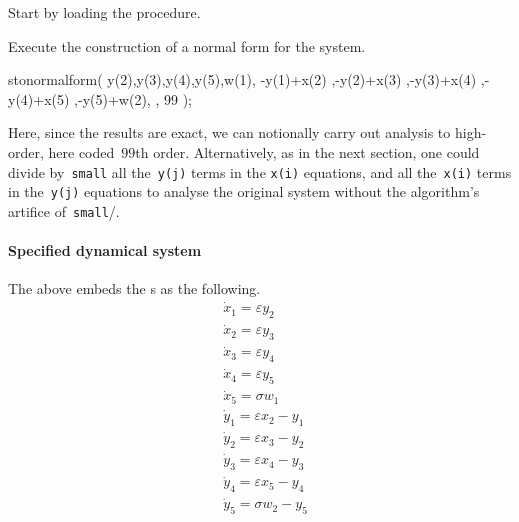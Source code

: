 Start by loading the procedure.
Execute the construction of a normal form for the system.
\begin{reduce}
stonormalform(
    {y(2),y(3),y(4),y(5),w(1)},
    {-y(1)+x(2)
    ,-y(2)+x(3)
    ,-y(3)+x(4)
    ,-y(4)+x(5)
    ,-y(5)+w(2)},
    { },
    99 );
\end{reduce}
Here, since the results are exact, we can notionally carry out analysis to high-order, here coded~\(99\)th order.  Alternatively, as in the next section, one could divide by~\verb|small| all the~\verb|y(j)| terms in the \verb|x(i)| equations, and all the~\verb|x(i)| terms in the~\verb|y(j)| equations to analyse the original system without the algorithm's artifice of~\verb|small|/\eps.

\paragraph{Specified dynamical system}
The above embeds the \ode{}s as the following. 
\begin{align*}&
\dot x_{1}=\varepsilon  y_{2}
\\& 
\dot x_{2}=\varepsilon  y_{3}
\\& 
\dot x_{3}=\varepsilon  y_{4}
\\& 
\dot x_{4}=\varepsilon  y_{5}
\\& 
\dot x_{5}=\sigma  w_{1}
\\& 
\dot y_{1}=\varepsilon  x_{2}-y_{1}
\\& 
\dot y_{2}=\varepsilon  x_{3}-y_{2}
\\& 
\dot y_{3}=\varepsilon  x_{4}-y_{3}
\\& 
\dot y_{4}=\varepsilon  x_{5}-y_{4}
\\& 
\dot y_{5}=\sigma  w_{2}-y_{5}
\end{align*}

